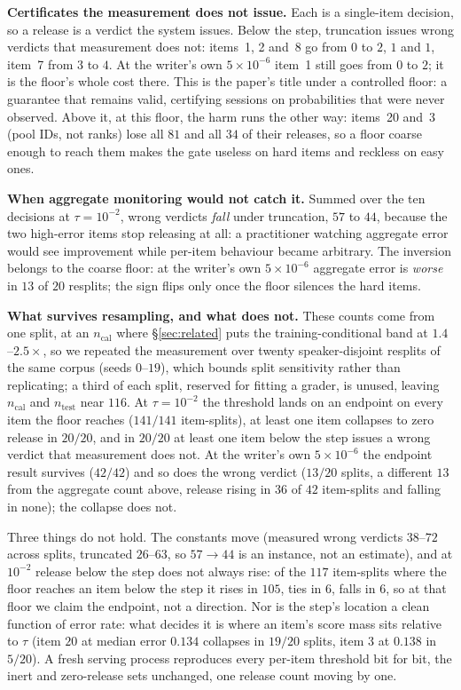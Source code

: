 \documentclass{article}
\newif\ifclaimtags\claimtagsfalse
\newcommand{\ct}[1]{\ifclaimtags\hfill{\scriptsize\textcolor{gray}{[#1]}}\fi}
\begin{document}
\textbf{Certificates the measurement does not issue.} Each is a single-item decision, so a release is a verdict the system issues. Below the step, truncation issues wrong verdicts that measurement does
not: items~1, 2 and~8 go from $0$ to $2$, $1$ and $1$, item~7 from $3$ to
$4$.\ct{C48} At the writer's own $5\times10^{-6}$ item~1 still goes from $0$ to $2$;
it is the floor's whole cost there. This is the paper's title under a controlled floor: a guarantee that
remains valid, certifying sessions on probabilities that were never
observed. Above it, at this floor, the harm runs the other way: items~20 and~3 (pool IDs, not ranks) lose all $81$ and all $34$ of their releases, so a floor coarse enough to reach
them makes the gate useless on hard items and reckless on easy ones.

\textbf{When aggregate monitoring would not catch it.} Summed over the ten
decisions at $\tau = 10^{-2}$, wrong verdicts \emph{fall} under truncation, $57$
to $44$, because the two high-error items stop releasing at all: a practitioner
watching aggregate error would see improvement while per-item behaviour became
arbitrary.\ct{C49} The inversion belongs to the coarse floor: at the writer's
own $5\times10^{-6}$ aggregate error is \emph{worse} in $13$ of
$20$ resplits; the sign flips only once the floor silences the hard items.\ct{C92}

\textbf{What survives resampling, and what does not.} These counts come from one split, at an $n_{\text{cal}}$ where
\S\ref{sec:related} puts the training-conditional band at $1.4$--$2.5\times$, so we repeated the measurement over twenty speaker-disjoint resplits
of the same corpus (seeds $0$--$19$), which bounds split sensitivity rather than replicating; a third of each split, reserved for fitting a grader, is unused, leaving $n_{\text{cal}}$ and $n_{\text{test}}$ near $116$. At $\tau = 10^{-2}$ the threshold lands on an endpoint on
every item the floor reaches ($141/141$ item-splits), at least one item collapses
to zero release in $20/20$, and in $20/20$ at least one item below the step
issues a wrong verdict that measurement does not. At the writer's own $5\times10^{-6}$ the endpoint result survives ($42/42$) and so does the wrong verdict ($13/20$ splits, a different $13$ from the aggregate count above, release rising in $36$ of $42$ item-splits and falling in none); the collapse does not.\ct{C91, C92, C93}

Three things do not hold. The constants move (measured wrong verdicts $38$--$72$ across splits,
truncated $26$--$63$, so $57 \to 44$ is an instance, not an estimate), and at $10^{-2}$ release below the step does not always rise: of the $117$ item-splits where the floor reaches an item below the step it rises in $105$, ties in $6$, falls in $6$, so at that floor we claim the endpoint, not a direction. Nor is the step's location a clean function of error rate: what decides it is where an item's score mass sits relative to $\tau$ (item $20$ at median error $0.134$ collapses in $19/20$ splits, item $3$ at $0.138$ in $5/20$). A fresh serving process reproduces every per-item threshold bit for bit, the inert and zero-release sets unchanged, one release count moving by one.\ct{C54, C55, C56, C57, C58, C59, C79}
\end{document}

